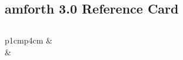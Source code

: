 \documentclass[a4paper,10pt]{article}
\def\colsa{p{1cm}p{4cm}}
\begin{document}
\thispagestyle{empty}
\pagestyle{empty}

\begin{footnotesize}
\section*{\Large amforth 3.0 Reference Card}
\begin{multicols}{3}

\subsection*{}
\begin{tabular}{\colsa}
% 
\verb||  & \verb//\\
              & \verb//\\
\end{tabular}


\end{multicols}
\end{footnotesize}
\end{document}
